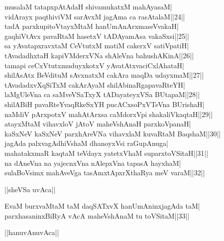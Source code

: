 \documentclass{article}
\begin{document}
musalaM tatapxpAtAdaH shivamukatxM mahAyasaM|\\
vidArayx paqthiviVM sarAvxM jagAma ca rasAtalaM||24||\\
tadA parxkupitoVtayxMtaM hanUmAnArxmaseVvakaH|\\
gaqhiVtAvx pavaRtaM hasetxV tADAyamAsa vakaSxsi||25||\\
sa yAvatapxravxtaM CeVtutxM matiM cakerxV satiVpatiH|\\
tAvadadhxtaH kapiVMderxVNa shAleVna bahushAKinA||26||\\
tamapi ceCxVtutxmuduyxkotxV yAvatAtxvaciCxlAhataH|\\
shilAsAtx BeVdituM sAvxnatxM cakAra maqDa udayxmaM||27||\\
tAvadadxvXqSiTxM cakArAyaM shilAbinaRgapavaRteYH|\\
laMgUleVna ca saMveVSaTxyX tADayateyxVSa BUtapaM||28||\\
shilABiH pavaRteYvaqRkeSxYH pucACxsoPxVTeVna BUrishaH|\\
naMdiV pArxpotxV mahAtArxsa caMdorxVpi shakaliVkaqtaH||29||\\
atayxMtaM vihavxloV jAtoV maheVshAnaH parxkoVpanaH|\\
kaSxNeV kaSxNeV parxhAreVNa vihavxlaM kuvaRtaM BaqshaM||30||\\
jagAda palxvagAdhiVshaM dhanoyxVsi raGupAnuga|\\
mahatakxmaR kaqtaM teVdayx yatetxVhaM suparxtoVSitaH||31||\\
na dAneVna na yajecnxVna nAlepxVna tapasA hayxhaM|\\
sulaBoVsimx mahAveVga tasAmxtApxrXthaRya meV varaM||32||\\

\begin{center}
||sheVSa uvAca||
\end{center}

EvaM burxvaMtaM taM daqSATxvX hanUmAninxjagAda taM|\\
parxhasaninxBiRyA vAcA maheVshAnaM tu toVSitaM||33||\\

\begin{center}
||hanuvAnuvAca||
\end{center}
\end{document}
